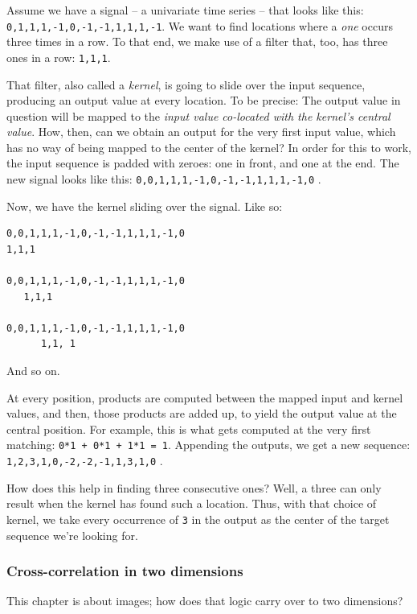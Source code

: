\documentclass[
  letterpaper,
]{krantz}
\begin{document}
Assume we have a signal -- a univariate time series -- that looks like
this: \texttt{0,1,1,1,-1,0,-1,-1,1,1,1,-1}. We want to find locations
where a \emph{one} occurs three times in a row. To that end, we make use
of a filter that, too, has three ones in a row: \texttt{1,1,1}.

That filter, also called a \emph{kernel}, is going to slide over the
input sequence, producing an output value at every location. To be
precise: The output value in question will be mapped to the \emph{input
value co-located with the kernel's central value}. How, then, can we
obtain an output for the very first input value, which has no way of
being mapped to the center of the kernel? In order for this to work, the
input sequence is padded with zeroes: one in front, and one at the end.
The new signal looks like this: \texttt{0,0,1,1,1,-1,0,-1,-1,1,1,1,-1,0}
.

Now, we have the kernel sliding over the signal. Like so:

\begin{verbatim}
0,0,1,1,1,-1,0,-1,-1,1,1,1,-1,0
1,1,1

0,0,1,1,1,-1,0,-1,-1,1,1,1,-1,0
   1,1,1

0,0,1,1,1,-1,0,-1,-1,1,1,1,-1,0
      1,1, 1
\end{verbatim}

And so on.

At every position, products are computed between the mapped input and
kernel values, and then, those products are added up, to yield the
output value at the central position. For example, this is what gets
computed at the very first matching: \texttt{0*1\ +\ 0*1\ +\ 1*1\ =\ 1}.
Appending the outputs, we get a new sequence:
\texttt{1,2,3,1,0,-2,-2,-1,1,3,1,0} .

How does this help in finding three consecutive ones? Well, a three can
only result when the kernel has found such a location. Thus, with that
choice of kernel, we take every occurrence of \texttt{3} in the output
as the center of the target sequence we're looking for.

\hypertarget{cross-correlation-in-two-dimensions}{%
\subsubsection{Cross-correlation in two
dimensions}\label{cross-correlation-in-two-dimensions}}

This chapter is about images; how does that logic carry over to two
dimensions?
\end{document}
